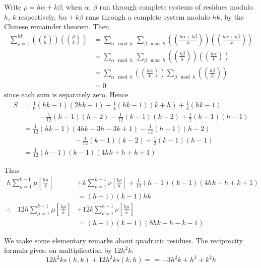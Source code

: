 Write $\rho= h \alpha + k \beta$; when $\alpha$, $\beta$ run through
complete systems of residues modulo $h$, $k$ respectively, $h \alpha +
k \beta$ runs through a complete system modulo $hk$, by the Chinese
remainder theorem. Then
\begin{align*}
  \sum^{hk}_{\rho=1} \left(\left(\frac{\rho}{h}\right)\right)
  \left(\left(\frac{\rho}{k}\right)\right)   & = \sum_{\alpha \mod k}~
  \sum_{\beta \mod h} \left(\left(\frac{h \alpha + k
    \beta}{h}\right)\right)\left(\left(\frac{h \alpha + k
    \beta}{k}\right)\right)\\
  & = \sum_{\alpha \mod k}~ \sum_{\beta \mod h}
  \left(\left(\frac{k \beta}{h}\right)\right)
  \left(\left(\frac{h \alpha}{k}\right)\right)\\
  & = \sum_{\alpha \mod k} \left(\left(\frac{h
    \alpha}{k}\right)\right) \sum_{\beta \mod h}
  \left(\left(\frac{k \beta}{h}\right)\right)\\
  & = 0
\end{align*}
since each sum is separately zero. Hence
\begin{align*}
  S & = \frac{1}{6} (hk-1)(2h k-1)- \frac{1}{4} (hk-1)(k+h)+ \frac{1}{4}
  (hk-1)\\ 
    & \qquad - \frac{1}{12} (h-1)(h-2)- \frac{1}{12} (k-1)(k-2)+
  \frac{1}{2} (k-1)(h-1)\\
  & = \frac{1}{12} (hk-1) (4hk-3 h-3 k+1)- \frac{1}{12} (h-1)(h-2)\\
  & \hspace{3cm}- \frac{1}{12} (k-1)(k-2) + \frac{1}{2} (k-1) (h-1)\\
  & = \frac{1}{12} (h-1)(k-1)(4 hk + h + k+1)
\end{align*}

Thus\pageoriginale
\begin{align*}
  h \sum^{k-1}_{\mu=1} \mu \left[ \frac{h \mu}{k}\right] & + k
  \sum^{h-1}_{\nu=1} \nu \left[\frac{k \nu}{h} \right]+ \frac{1}{12}
  (h-1)(k-1)(4hk+h+k+1)\\
  & = (h-1)(k-1) hk\\
  \therefore \quad 12h \sum^{k-1}_{\mu=1} \mu \left[ \frac{h
      \mu}{k}\right] & + 12 k \sum^{h-1}_{\nu=1} \nu \left[ \frac{k
      \mu}{h}\right]\\
  & = (h-1) (k-1)(8hk-h-k-1)
\end{align*}

We make some elementary remarks about quadratic residues. The
reciprocity formula gives, on multiplication by $12h^2 k$.
$$
12h^2 k s(h, k)+ 12 h^2 k s(k, h)= =- 3h^2k + h^3 + k^2 h
$$

